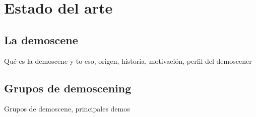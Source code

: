 
\chapter{Estado del arte}

\section{La demoscene}

Qué es la demoscene y to eso, origen, historia, motivación, perfil del demoscener

\section{Grupos de demoscening}

Grupos de demoscene, principales demos

